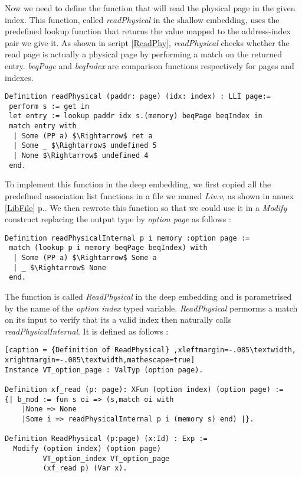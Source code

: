 Now we need to define the function that will read the physical page in the given index. This function, called \textit{readPhysical} in the shallow embedding,  uses the predefined lookup function that returns the value mapped to the address-index pair we give it. As shown in script \ref{ReadPhy}, \textit{readPhysical} checks whether the read page is actually a physical page by performing a match on the returned entry. \textit{beqPage} and \textit{beqIndex} are comparison functions respectively for pages and indexes. 
\begin{lstlisting}[caption = {readPhysical function in the shallow embedding},xleftmargin=-.06\textwidth,
xrightmargin=-.06\textwidth ,label={ReadPhy},mathescape=true]
Definition readPhysical (paddr: page) (idx: index) : LLI page:=
 perform s := get in
 let entry := lookup paddr idx s.(memory) beqPage beqIndex in
 match entry with
  | Some (PP a) $\Rightarrow$ ret a
  | Some _ $\Rightarrow$ undefined 5
  | None $\Rightarrow$ undefined 4
 end.
\end{lstlisting} \vspace{4pt}
To implement this function in the deep embedding, we first copied all the predefined association list functions in a file we named \textit{Liv.v}, as shown in annex \ref{LibFile} p.\pageref{LibFile}. We then rewrote this function so that we could use it in a \textit{Modify} construct replacing the output type by \textit{option page} as follows :
\begin{lstlisting}[caption = {Rewritten shallow readPhysical function},xleftmargin=-.02\textwidth,
xrightmargin=-.02\textwidth,mathescape=true]
Definition readPhysicalInternal p i memory :option page := 
 match (lookup p i memory beqPage beqIndex) with
  | Some (PP a) $\Rightarrow$ Some a
  | _ $\Rightarrow$ None
 end.
\end{lstlisting} \vspace{4pt}
The function is called \textit{ReadPhysical} in the deep embedding and is parametrised by the name of the \textit{option index} typed variable. \textit{ReadPhysical} permorms a match on its input to verify that its a valid index then naturally calls \textit{readPhysicalInternal}. It is defined as follows : 
\begin{lstlisting}[caption = {Definition of ReadPhysical} ,xleftmargin=-.085\textwidth,
xrightmargin=-.085\textwidth,mathescape=true]
Instance VT_option_page : ValTyp (option page).

Definition xf_read (p: page): XFun (option index) (option page) := 
{| b_mod := fun s oi => (s,match oi with 
   	|None => None 
   	|Some i => readPhysicalInternal p i (memory s) end) |}.

Definition ReadPhysical (p:page) (x:Id) : Exp :=
  Modify (option index) (option page) 
         VT_option_index VT_option_page 
         (xf_read p) (Var x).
\end{lstlisting} \vspace{4pt}

